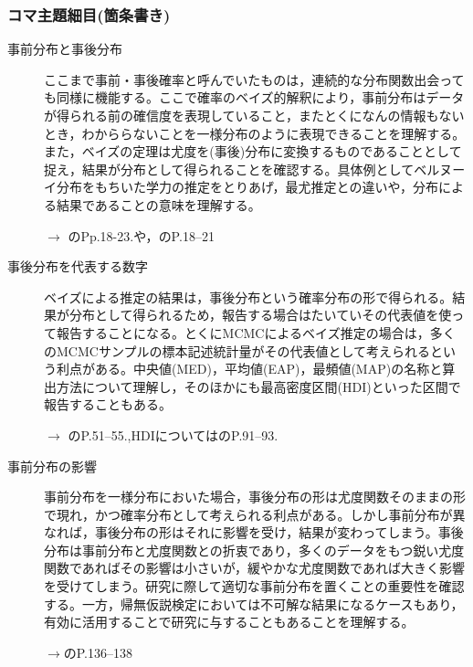 \subsubsection{コマ主題細目(箇条書き)}
\begin{description}
	\item[事前分布と事後分布] ここまで事前・事後確率と呼んでいたものは，連続的な分布関数出会っても同様に機能する。ここで確率のベイズ的解釈により，事前分布はデータが得られる前の確信度を表現していること，またとくになんの情報もないとき，わかららないことを一様分布のように表現できることを理解する。また，ベイズの定理は尤度を(事後)分布に変換するものであることとして捉え，結果が分布として得られることを確認する。具体例としてベルヌーイ分布をもちいた学力の推定をとりあげ，最尤推定との違いや，分布による結果であることの意味を理解する。
	      \begin{flushright}
		      $\to$ \textcite{Maeda2017}のPp.18-23.や，\textcite{Toyoda201606}のP.18--21
	      \end{flushright}

	\item[事後分布を代表する数字]ベイズによる推定の結果は，事後分布という確率分布の形で得られる。結果が分布として得られるため，報告する場合はたいていその代表値を使って報告することになる。とくにMCMCによるベイズ推定の場合は，多くのMCMCサンプルの標本記述統計量がその代表値として考えられるという利点がある。中央値(MED)，平均値(EAP)，最頻値(MAP)の名称と算出方法について理解し，そのほかにも最高密度区間(HDI)といった区間で報告することもある。
	      \begin{flushright}
		      $\to$ \textcite{Toyoda201506}のP.51--55.,HDIについては\textcite{Maeda2017}のP.91--93.
	      \end{flushright}

	\item[事前分布の影響]事前分布を一様分布においた場合，事後分布の形は尤度関数そのままの形で現れ，かつ確率分布として考えられる利点がある。しかし事前分布が異なれば，事後分布の形はそれに影響を受け，結果が変わってしまう。事後分布は事前分布と尤度関数との折衷であり，多くのデータをもつ鋭い尤度関数であればその影響は小さいが，緩やかな尤度関数であれば大きく影響を受けてしまう。研究に際して適切な事前分布を置くことの重要性を確認する。一方，帰無仮説検定においては不可解な結果になるケースもあり，有効に活用することで研究に与することもあることを理解する。
	      \begin{flushright}
		      $\to$\textcite{Maeda2017}のP.136--138
	      \end{flushright}

\end{description}
